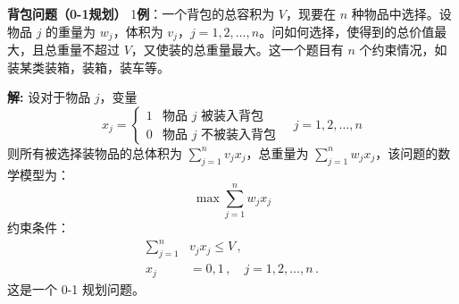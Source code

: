 \begin{exbox}{\textbf{背包问题（0-1规划）}}
    1\textbf{例}：一个背包的总容积为 $V$，现要在 $n$ 种物品中选择。设物品 $j$ 的重量为 $w_j$，体积为 $v_j$，$j=1,2,\dots,n$。问如何选择，使得到的总价值最大，且总重量不超过 $V$，又使装的总重量最大。这一个题目有 $n$ 个约束情况，如装某类装箱，装箱，装车等。
    
    \textbf{解:} 设对于物品 $j$，变量
    \[
    x_j = \begin{cases} 
        1 & \text{物品 $j$ 被装入背包} \\ 
        0 & \text{物品 $j$ 不被装入背包}
    \end{cases} \quad j=1,2,\dots,n
    \]
    则所有被选择装物品的总体积为 $\sum_{j=1}^{n} v_j x_j$，总重量为 $\sum_{j=1}^{n} w_j x_j$，该问题的数学模型为：
    \begin{equation}
        \max \sum_{j=1}^{n} w_j x_j \label{eq:Chapter4_obj_2}
    \end{equation}
    约束条件：
    \begin{align}
        \sum_{j=1}^{n}  &v_j x_j\leq V \,, \label{eq:constraint} \\
        x_j &= 0, 1 \,, \quad j=1,2,\dots,n \,. \label{eq:binary}
    \end{align}
    这是一个 0-1 规划问题。
\end{exbox}


